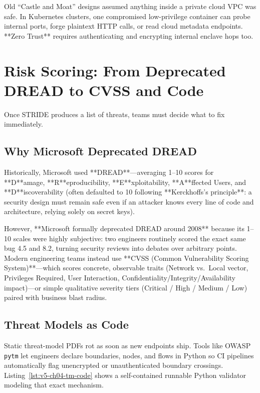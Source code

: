\begin{commonmistakebox}
Old ``Castle and Moat'' designs assumed anything inside a private cloud VPC was safe. In Kubernetes clusters, one compromised low-privilege container can probe internal ports, forge plaintext HTTP calls, or read cloud metadata endpoints. **Zero Trust** requires authenticating and encrypting internal enclave hops too.
\end{commonmistakebox}

\section{Risk Scoring: From Deprecated DREAD to CVSS and Code}

Once STRIDE produces a list of threats, teams must decide what to fix immediately.

\subsection{Why Microsoft Deprecated DREAD}

Historically, Microsoft used **DREAD**—averaging 1--10 scores for **D**amage, **R**eproducibility, **E**xploitability, **A**ffected Users, and **D**iscoverability (often defaulted to 10 following **Kerckhoffs's principle**: a security design must remain safe even if an attacker knows every line of code and architecture, relying solely on secret keys).

However, **Microsoft formally deprecated DREAD around 2008** because its 1--10 scales were highly subjective: two engineers routinely scored the exact same bug 4.5 and 8.2, turning security reviews into debates over arbitrary points. Modern engineering teams instead use **CVSS (Common Vulnerability Scoring System)**—which scores concrete, observable traits (Network vs.\ Local vector, Privileges Required, User Interaction, Confidentiality/Integrity/Availability impact)---or simple qualitative severity tiers (Critical / High / Medium / Low) paired with business blast radius.

\subsection{Threat Models as Code}

Static threat-model PDFs rot as soon as new endpoints ship. Tools like OWASP \texttt{pytm} let engineers declare boundaries, nodes, and flows in Python so CI pipelines automatically flag unencrypted or unauthenticated boundary crossings. Listing~\ref{lst:v5-ch04-tm-code} shows a self-contained runnable Python validator modeling that exact mechanism.

